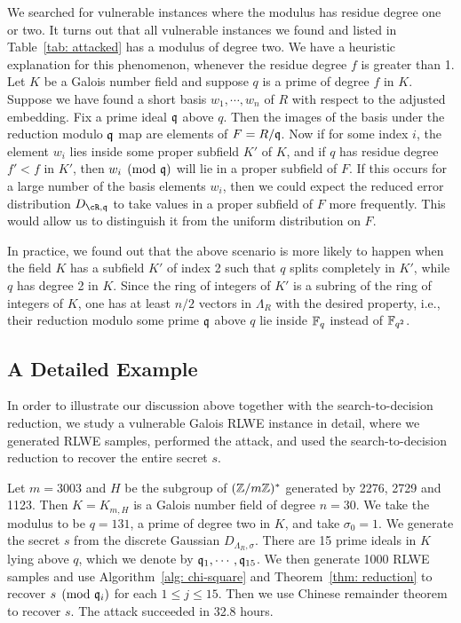 \documentclass[envcountsect]{llncs}
\begin{document}
We searched for vulnerable instances where the modulus has residue degree one or two. It turns out that all vulnerable instances we found and listed in Table~\ref{tab: attacked} has a modulus of degree two.  We have a heuristic explanation for this phenomenon, whenever the residue degree $f$ is greater than 1.  Let $K$  be a Galois number field and suppose $q$ is a prime of degree $f$ in $K$. Suppose we have found a short basis $w_1,\cdots, w_n$ of $R$ with respect to the adjusted embedding. Fix a prime ideal $\mathfrak{q}$ above $q$. Then the images of the basis under the reduction modulo $\mathfrak{q}$ map are elements of $F = R/\mathfrak{q}$. Now if for some index $i$, the element $w_i$ lies inside some proper subfield $K'$ of $K$, and if $q$ has residue degree $f' < f$ in $K'$, then $w_i \pmod{\mathfrak{q}}$ will lie in a proper subfield of $F$. If this occurs for a large number of the basis elements $w_i$, then we could  expect the reduced error distribution $D_{\cR,\fq}$ to take values in a proper subfield of $F$ more frequently. This would allow us to distinguish it from the uniform distribution on $F$.

In practice, we found out that the above scenario is more likely to happen when the field $K$ has a subfield $K'$ of index 2 such that $q$ splits completely in $K'$, while $q$ has degree 2 in $K$. Since the ring of integers of $K'$ is a subring of the ring of integers of $K$, one has at least $n/2$ vectors in $\Lambda_R$ with the desired property, i.e., their reduction modulo some prime $\mathfrak{q}$ above $q$ lie inside $\mathbb{F}_q$ instead of $\mathbb{F}_{q^2}$. 



\subsection{A Detailed Example}
In order to illustrate our discussion above together with the search-to-decision reduction, we study a vulnerable Galois RLWE instance in detail, where we generated RLWE samples, performed the attack, and used the search-to-decision reduction to recover the entire secret $s$.


Let $m = 3003$ and $H$ be the subgroup of $(\mathbb{Z}/m\mathbb{Z})^*$ generated by 2276, 2729 and 1123. Then $K = K_{m,H}$ is a Galois number field of degree $n = 30$. We take the modulus to be $q = 131$, a prime of degree two in $K$, and take $\sigma_0 = 1$. We generate the secret $s$ from the discrete Gaussian $D_{\Lambda_R, \sigma}$.  There are 15 prime ideals in $K$ lying above $q$, which we denote by $\mathfrak{q}_1, \cdots, \mathfrak{q}_{15}$. We then generate 1000 RLWE samples and use Algorithm~\ref{alg: chi-square} and Theorem~\ref{thm: reduction} to recover $s \pmod {\mathfrak{q}_i}$ for each $1 \leq j \leq 15$. Then we use Chinese remainder theorem to recover $s$. The attack succeeded in 32.8 hours.
\end{document}
